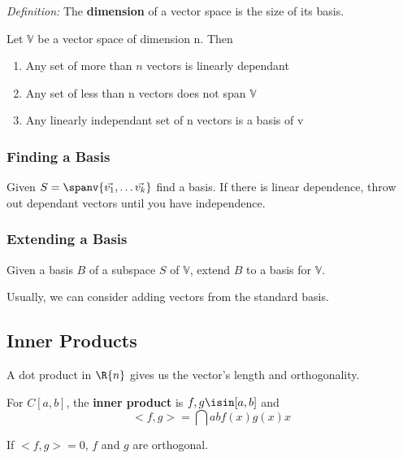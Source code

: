 \documentclass[12pt]{article}
\begin{document}

\textit{Definition:} The {\bf dimension} of a vector space is the size of its basis.

Let $\mathbb{V}$ be a vector space of dimension n. Then
\begin{enumerate}
\item Any set of more than $n$ vectors is linearly dependant
\item Any set of less than n vectors does not span $\mathbb{V}$
\item Any linearly independant set of n vectors is a basis of v
\end{enumerate}

\subsubsection*{Finding a Basis}
Given $S = \spanv{\vec{v_1},\dots \vec{v_k}}$ find a basis. If there is linear dependence, throw out dependant vectors until you have independence.


\subsubsection*{Extending a Basis}
Given a basis $B$ of a subspace $S$ of $\mathbb{V}$, extend $B$ to a basis for $\mathbb{V}$.


Usually, we can consider adding vectors from the standard basis.

\subsection*{Inner Products}
A dot product in $\R{n}$ gives us the vector's length and orthogonality.

For $C[a,b]$, the {\bf inner product} is $f, g \isin [a,b]$ and \[ <f,g> = \dint{a}{b}{f(x)g(x)}{x} \]

If $<f,g> = 0$, $f$ and $g$ are orthogonal.
\end{document}
